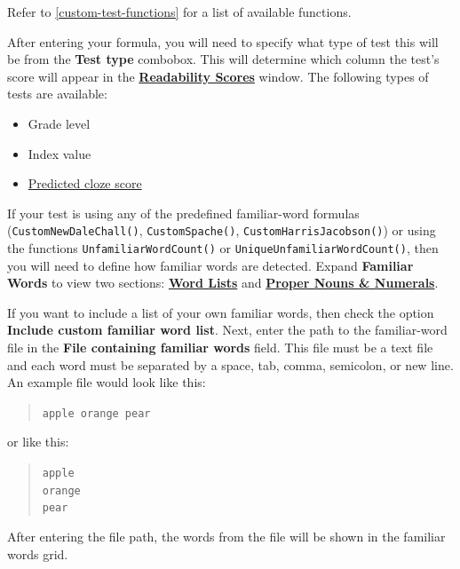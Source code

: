 \documentclass[
]{book}
\providecommand{\tightlist}{%
  \setlength{\itemsep}{0pt}\setlength{\parskip}{0pt}}
\theoremstyle{definition}
\theoremstyle{definition}
\theoremstyle{definition}
\theoremstyle{definition}
\theoremstyle{remark}
\begin{document}
Refer to \ref{custom-test-functions} for a list of available functions.

\begin{minipage}{\textwidth}

After entering your formula, you will need to specify what type of test this will be from the \textbf{Test type} combobox. This will determine which column the test's score will appear in the \protect\hyperlink{reviewing-test-scores}{\textbf{Readability Scores}} window. The following types of tests are available:

\begin{itemize}
\tightlist
\item
  Grade level
\item
  Index value
\item
  \protect\hyperlink{cloze}{Predicted cloze score}
\end{itemize}

\end{minipage}

If your test is using any of the predefined familiar-word formulas (\texttt{CustomNewDaleChall()}, \texttt{CustomSpache()}, \texttt{CustomHarrisJacobson()}) or using the functions \texttt{UnfamiliarWordCount()} or \texttt{UniqueUnfamiliarWordCount()}, then you will need to define how familiar words are detected. Expand \textbf{Familiar Words} to view two sections: \protect\hyperlink{custom-word-list}{\textbf{Word Lists}} and \protect\hyperlink{custom-proper-numerals}{\textbf{Proper Nouns \& Numerals}}.

If you want to include a list of your own familiar words, then check the option \textbf{Include custom familiar word list}. Next, enter the path to the familiar-word file in the \textbf{File containing familiar words} field. This file must be a text file and each word must be separated by a space, tab, comma, semicolon, or new line. An example file would look like this:

\begin{quote}
\texttt{apple\ orange\ pear}
\end{quote}

or like this:

\begin{quote}
\texttt{apple}~\\
\texttt{orange}~\\
\texttt{pear}
\end{quote}

After entering the file path, the words from the file will be shown in the familiar words grid.
\end{document}
